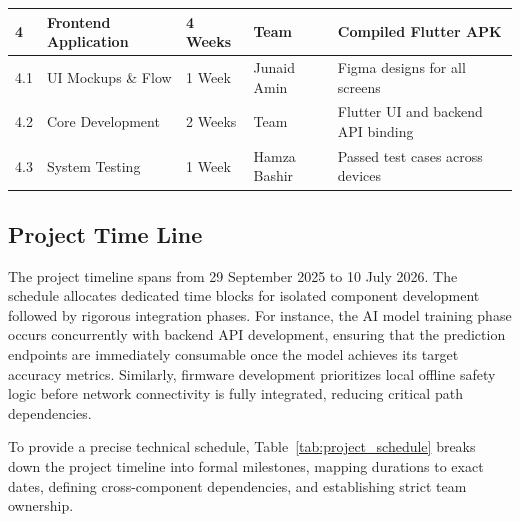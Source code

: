 \begin{longtable}{|p{0.8cm}|p{3.5cm}|p{2cm}|p{3.5cm}|p{4.5cm}|}
\textbf{4} & \textbf{Frontend Application} & \textbf{4 Weeks} & \textbf{Team} & \textbf{Compiled Flutter APK} \\ \hline
4.1 & UI Mockups \& Flow & 1 Week & Junaid Amin & Figma designs for all screens \\ \hline
4.2 & Core Development & 2 Weeks & Team & Flutter UI and backend API binding \\ \hline
4.3 & System Testing & 1 Week & Hamza Bashir & Passed test cases across devices \\ \hline

\end{longtable}

\subsection{Project Time Line}
The project timeline spans from 29 September 2025 to 10 July 2026. 
The schedule allocates dedicated time blocks for isolated component 
development followed by rigorous integration phases. For instance, 
the AI model training phase occurs concurrently with backend API 
development, ensuring that the prediction endpoints are immediately 
consumable once the model achieves its target accuracy metrics. 
Similarly, firmware development prioritizes local offline safety 
logic before network connectivity is fully integrated, reducing 
critical path dependencies.

To provide a precise technical schedule, Table~\ref{tab:project_schedule} breaks down the project timeline into formal milestones, mapping durations to exact dates, defining cross-component dependencies, and establishing strict team ownership.

